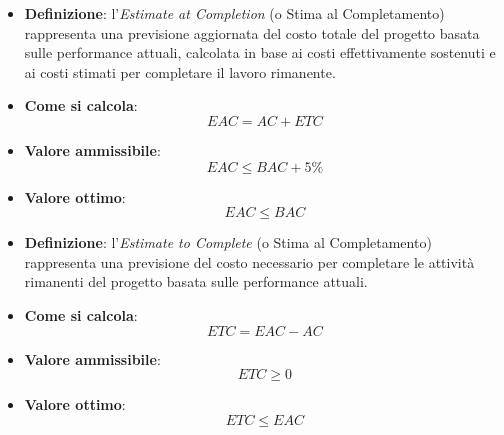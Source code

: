 \hypertarget{8M}{}
\begin{itemize}
	\item \textbf{Definizione}: l'\textit{Estimate at Completion} (o Stima al Completamento) rappresenta una previsione aggiornata del costo totale del progetto basata sulle performance attuali, calcolata in base ai costi effettivamente sostenuti e ai costi stimati per completare il lavoro rimanente.
	\item \textbf{Come si calcola}: \begin{equation*}EAC = AC + ETC\end{equation*}
	\item \textbf{Valore ammissibile}: \begin{equation*}EAC \leq BAC + 5\%\end{equation*}
	\item \textbf{Valore ottimo}: \begin{equation*}EAC \leq BAC\end{equation*}
\end{itemize}

\hypertarget{9M}{}
\begin{itemize}
	\item \textbf{Definizione}: l'\textit{Estimate to Complete} (o Stima al Completamento) rappresenta una previsione del costo necessario per completare le attività rimanenti del progetto basata sulle performance attuali.
	\item \textbf{Come si calcola}: \begin{equation*}ETC = EAC - AC\end{equation*}
	\item \textbf{Valore ammissibile}: \begin{equation*}ETC \geq 0\end{equation*}
	\item \textbf{Valore ottimo}: \begin{equation*}ETC \leq EAC\end{equation*}
\end{itemize}

